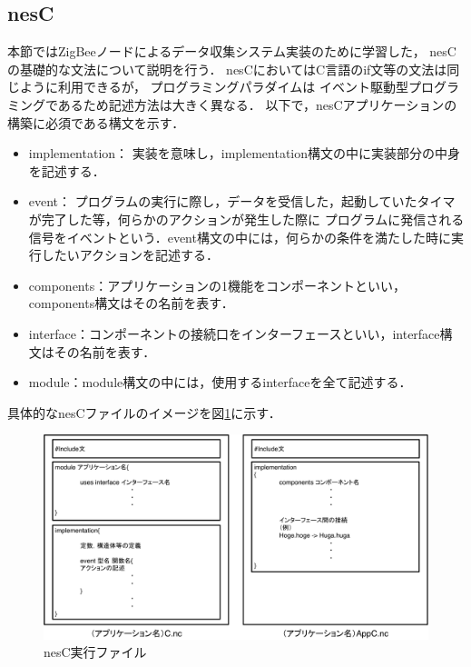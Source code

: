 \documentclass[12pt]{jreport}
\begin{document}
\subsection{nesC}
\label{ssec:nesC}

本節ではZigBeeノードによるデータ収集システム実装のために学習した，
nesCの基礎的な文法について説明を行う．
nesCにおいてはC言語のif文等の文法は同じように利用できるが，
プログラミングパラダイムは
イベント駆動型プログラミングであるため記述方法は大きく異なる．
以下で，nesCアプリケーションの構築に必須である構文を示す．

\begin{itemize}
 \item implementation： 実装を意味し，implementation構文の中に実装部分の中身を記述する．
 \item event： プログラムの実行に際し，データを受信した，起動していたタイマが完了した等，何らかのアクションが発生した際に
 プログラムに発信される信号をイベントという．event構文の中には，何らかの条件を満たした時に実行したいアクションを記述する．
 \item components：アプリケーションの1機能をコンポーネントといい，components構文はその名前を表す．
 \item interface：コンポーネントの接続口をインターフェースといい，interface構文はその名前を表す．
 \item module：module構文の中には，使用するinterfaceを全て記述する．
\end{itemize}

具体的なnesCファイルのイメージを図\ref{fig:nesC_program}に示す．

\begin{figure}[bt]
 \centering
 \includegraphics[width=\columnwidth]{figure/nesC_program.pdf}
 \caption{nesC実行ファイル}
 \label{fig:nesC_program}
\end{figure}
\end{document}
